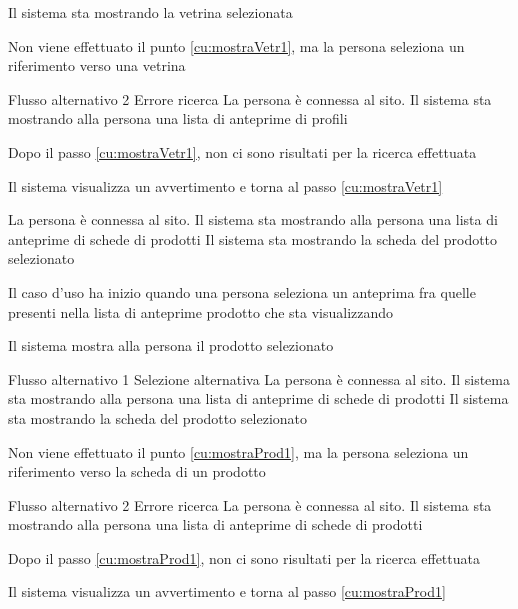 {Il sistema sta mostrando la vetrina selezionata}%
{\begin{enumCU}
	\item Non viene effettuato il punto \ref{cu:mostraVetr1}, ma la persona seleziona un \gls{riferimento} verso una vetrina
\end{enumCU}}%
%
%
{Flusso alternativo 2}%
{Errore ricerca}%
{La persona è connessa al sito. Il sistema sta mostrando alla persona una lista di anteprime di profili}%
{\postNulle}%
{\begin{enumCU}
	\item Dopo il passo \ref{cu:mostraVetr1}, non ci sono risultati per la ricerca effettuata
	\item Il sistema visualizza un avvertimento e torna al passo \ref{cu:mostraVetr1}
\end{enumCU}}%


{La persona è connessa al sito. Il sistema sta mostrando alla persona una lista di anteprime di schede di prodotti}
{Il sistema sta mostrando la scheda del prodotto selezionato}
{\begin{enumCU}
	\item Il caso d'uso ha inizio quando una persona seleziona un anteprima fra quelle presenti nella lista di anteprime prodotto che sta visualizzando\label{cu:mostraProd1}
	\item Il sistema mostra alla persona il prodotto selezionato
	\item {}
\end{enumCU}
}
%
{Flusso alternativo 1}%
{Selezione alternativa}%
{La persona è connessa al sito. Il sistema sta mostrando alla persona una lista di anteprime di schede di prodotti}%
{Il sistema sta mostrando la scheda del prodotto selezionato}%
{\begin{enumCU}
		\item Non viene effettuato il punto \ref{cu:mostraProd1}, ma la persona seleziona un \gls{riferimento} verso la scheda di un prodotto
\end{enumCU}}%
%
{Flusso alternativo 2}%
{Errore ricerca}%
{La persona è connessa al sito. Il sistema sta mostrando alla persona una lista di anteprime di schede di prodotti}%
{\postNulle}%
{\begin{enumCU}
		\item Dopo il passo \ref{cu:mostraProd1}, non ci sono risultati per la ricerca effettuata
		\item Il sistema visualizza un avvertimento e torna al passo \ref{cu:mostraProd1}
\end{enumCU}}%

